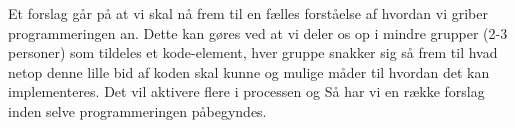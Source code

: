 Et forslag går på at vi skal nå frem til en fælles forståelse af hvordan vi griber programmeringen an. Dette kan gøres ved at vi deler os op i mindre grupper (2-3 personer) som tildeles et kode-element, hver gruppe snakker sig så frem til hvad netop denne lille bid af koden skal kunne  og mulige måder til hvordan det kan implementeres. Det vil aktivere flere i processen og Så har vi en række forslag inden selve programmeringen påbegyndes.